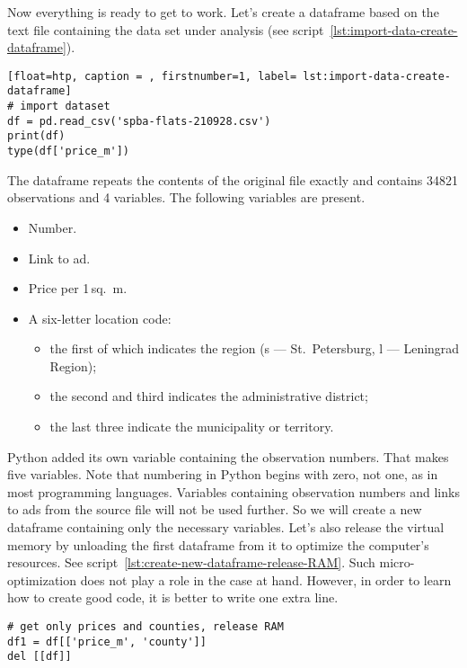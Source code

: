 \documentclass[]{scrreprt}
\begin{document}
Now everything is ready to get to work. Let's create a dataframe based on the text file containing the data set under analysis (see script~\ref{lst:import-data-create-dataframe}).
%
\begin{lstlisting}[float=htp, caption = , firstnumber=1, label= lst:import-data-create-dataframe]
# import dataset
df = pd.read_csv('spba-flats-210928.csv')
print(df)
type(df['price_m'])
\end{lstlisting}
%
The dataframe repeats the contents of the original file exactly and contains 34821 observations and 4 variables. The following variables are present.
\begin{itemize}
	\item Number.
	\item Link to ad.
	\item Price per 1\,sq.~m.
	\item A six-letter location code:
	\begin{itemize}
		\item the first of which indicates the region (s --- St.~Petersburg, l --- Leningrad Region);
		\item the second and third indicates the administrative district;
		\item the last three indicate the municipality or territory.		
	\end{itemize}
\end{itemize}
Python added its own variable containing the observation numbers. That makes five variables. Note that numbering in Python begins with zero, not one, as in most programming languages. Variables containing observation numbers and links to ads from the source file will not be used further. So we will create a new dataframe containing only the necessary variables. Let's also release the virtual memory by unloading the first dataframe from it to optimize the computer's resources. See script~\ref{lst:create-new-dataframe-release-RAM}. Such micro-optimization does not play a role in the case at hand. However, in order to learn how to create good code, it is better to write one extra line.
%
\begin{lstlisting}[float=htp, caption = Creating a dataframe containing only necessary variables and freeing memory from objects not used later, firstnumber=1, label= lst:create-new-dataframe-release-RAM]
# get only prices and counties, release RAM
df1 = df[['price_m', 'county']]
del [[df]]
\end{lstlisting}
%
\end{document}
